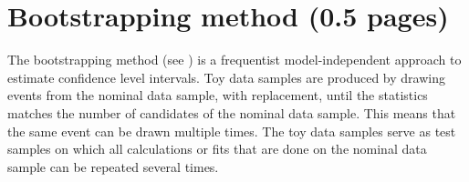 
\section{Bootstrapping method (0.5 pages)}
\label{sec:dataanalysis:bootstrapping}

The bootstrapping method (see \eg \cite{Behnke:2013pga}) is a frequentist
model-independent approach to estimate confidence level intervals. Toy data
samples are produced by drawing events from the nominal data sample, with
replacement, until the statistics matches the number of candidates of the
nominal data sample. This means that the same event can be drawn multiple
times. The toy data samples serve as test samples on which all calculations or
fits that are done on the nominal data sample can be repeated several times.

